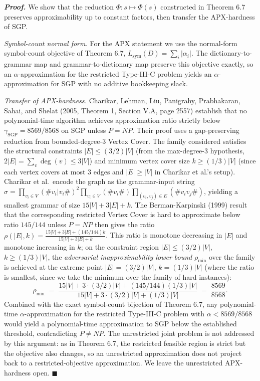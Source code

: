 \documentclass[
]{article}
\begin{document}
\emph{\textbf{Proof.}} We show that the reduction
$\Phi: s \mapsto \Phi(s)$ constructed in Theorem 6.7 preserves
approximability up to constant factors, then transfer the
APX-hardness of SGP.

\emph{Symbol-count normal form.} For the APX statement we use the
normal-form symbol-count objective of Theorem 6.7,
$L_{\mathrm{sym}}(D) = \sum_i |\alpha_i|$. The dictionary-to-grammar
map and grammar-to-dictionary map preserve this objective exactly, so
an $\alpha$-approximation for the restricted Type-III-C problem yields
an $\alpha$-approximation for SGP with no additive bookkeeping slack.

\emph{Transfer of APX-hardness.} Charikar, Lehman, Liu, Panigrahy,
Prabhakaran, Sahai, and Shelat (2005, Theorem 1, Section V.A,
page 2557) establish that no polynomial-time algorithm achieves
approximation ratio strictly below
$\gamma_{\mathrm{SGP}} = 8569/8568$ on SGP unless $P = NP$. Their
proof uses a gap-preserving reduction from bounded-degree-3 Vertex
Cover. The family considered satisfies the structural constraints
$|E| \leq (3/2)|V|$ (from the max-degree-3 hypothesis,
$2|E| = \sum_v \deg(v) \leq 3|V|$) and minimum vertex cover size
$k \geq (1/3)|V|$ (since each vertex covers at most 3 edges and
$|E| \geq |V|$ in Charikar et al.'s setup). Charikar et al.\
encode the graph as the grammar-input string
$\sigma = \prod_{v_i \in V}(\#v_i | v_i\#)^2 \prod_{v_i \in V}(\#v_i\#) \prod_{(v_i, v_j) \in E}(\#v_i v_j\#)$,
yielding a smallest grammar of size $15|V| + 3|E| + k$. The
Berman-Karpinski (1999) result that the corresponding restricted
Vertex Cover is hard to approximate below ratio $145/144$ unless
$P = NP$ then gives the ratio
$\rho(|E|, k) = \frac{15|V| + 3|E| + (145/144)k}{15|V| + 3|E| + k}$.
This ratio is monotone decreasing in $|E|$ and monotone increasing
in $k$; on the constraint region $|E| \leq (3/2)|V|$, $k \geq
(1/3)|V|$, the \emph{adversarial inapproximability lower bound}
$\rho_{\min}$ over the family is achieved at the extreme point
$|E| = (3/2)|V|$, $k = (1/3)|V|$ (where the ratio is smallest, since
we take the minimum over the family of hard instances):
\[
\rho_{\min} \;=\; \frac{15|V| + 3 \cdot (3/2)|V| + (145/144)(1/3)|V|}{15|V| + 3 \cdot (3/2)|V| + (1/3)|V|}
\;=\; \frac{8569}{8568}.
\]
Combined with the exact symbol-count bijection of Theorem 6.7, any
polynomial-time $\alpha$-approximation for the restricted
Type-III-C problem with $\alpha < 8569/8568$ would yield a
polynomial-time approximation to SGP below the established
threshold, contradicting $P \neq NP$. The unrestricted joint
problem is not addressed by this argument: as in Theorem 6.7, the
restricted feasible region is strict but the objective also
changes, so an unrestricted approximation does not project back to
a restricted-objective approximation. We leave the unrestricted
APX-hardness open. \hfill$\blacksquare$
\end{document}
